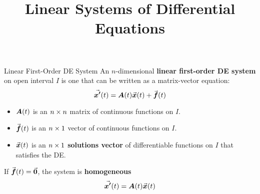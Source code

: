 \documentclass{beamer}
\title[MA245 - Section 6.1]{Linear Systems of Differential Equations}
\begin{document}
\begin{frame}
  \titlepage
\end{frame}

\begin{frame}
\begin{block}{Linear First-Order DE System}
An $n$-dimensional \textbf{linear first-order DE system} on open interval $I$ is one that can be written as a matrix-vector equation:
\begin{equation*}
{\vec{\boldsymbol{x^\prime}}}(t)=\boldsymbol{A}(t){\vec{\boldsymbol{x}}}(t)+{\vec{\boldsymbol{f}}}(t)
\end{equation*}
\onslide<+->
\begin{itemize}[<+- | alert@+>]
\item $\boldsymbol{A}(t)$ is an $n\times n$ matrix of continuous functions on $I$.
\item ${\vec{\boldsymbol{f}}}(t)$ is an $n\times 1$ vector of continuous functions on $I$.
\item ${\vec{\boldsymbol{x}}}(t)$ is an $n\times 1$ \textbf{solutions vector} of differentiable functions on $I$ that satisfies the DE\@.
\end{itemize}
\onslide<+->
If ${\vec{\boldsymbol{f}}}(t)={\vec{\boldsymbol{0}}}$, the system is \textbf{homogeneous}
\begin{equation*}
{\vec{\boldsymbol{x^\prime}}} (t)=\boldsymbol{A}(t){\vec{\boldsymbol{x}}}(t)
\end{equation*}
\end{block}
\end{frame}
\end{document}
